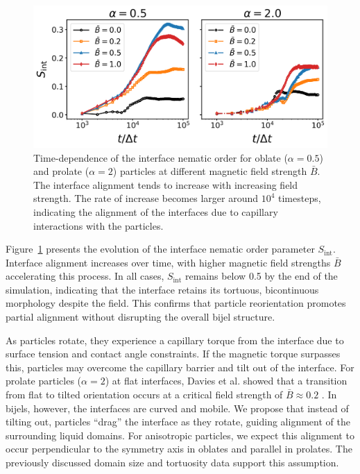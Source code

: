     \begin{figure}
        \centering
    \includegraphics[scale=0.6]{../figures/results/paper1/interface_nematic.png}
    \caption{Time-dependence of the interface nematic order for oblate ($\alpha=0.5$) and prolate ($\alpha=2$) particles at different magnetic field strength $\bar{B}$. The interface alignment tends to increase with increasing field strength. The rate of increase becomes larger around $10^4$ timesteps, indicating the alignment of the interfaces due to capillary interactions with the particles.}
    \label{fig:interface_nematic}
    \end{figure}

Figure~\ref{fig:interface_nematic} presents the evolution of the interface nematic order parameter \(S_{\text{int}}\). Interface alignment increases over 
time, with higher magnetic field strengths \(\bar{B}\) accelerating this process. In all cases, \(S_{\text{int}}\) remains below 0.5 by the end of the 
simulation, indicating that the interface retains its tortuous, bicontinuous morphology despite the field. This confirms that particle reorientation promotes 
partial alignment without disrupting the overall bijel structure.
    
As particles rotate, they experience a capillary torque from the interface due to surface tension and contact angle constraints. If the magnetic torque 
surpasses this, particles may overcome the capillary barrier and tilt out of the interface. For prolate particles (\(\alpha = 2\)) at flat interfaces, 
Davies et al. showed that a transition from flat to tilted orientation occurs at a critical field strength of \(\bar{B} \approx 0.2\) 
\cite{bresme_orientational_2007,davies_interface_2014,newton_influence_2014}. In bijels, however, the interfaces are curved and mobile. We propose that 
instead of tilting out, particles “drag” the interface as they rotate, guiding alignment of the surrounding liquid domains. For anisotropic particles, 
we expect this alignment to occur perpendicular to the symmetry axis in oblates and parallel in prolates. The previously discussed domain size and 
tortuosity data support this assumption.
    
